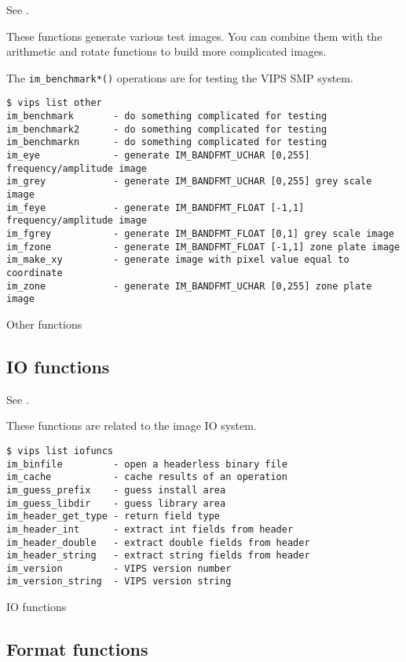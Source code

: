 See .

These functions generate various test images. You can combine them with
the arithmetic and rotate functions to build more complicated images.

The \verb+im_benchmark*()+ operations are for testing the VIPS SMP system.

\begin{fig2}
\begin{verbatim}
$ vips list other
im_benchmark       - do something complicated for testing
im_benchmark2      - do something complicated for testing
im_benchmarkn      - do something complicated for testing
im_eye             - generate IM_BANDFMT_UCHAR [0,255] frequency/amplitude image
im_grey            - generate IM_BANDFMT_UCHAR [0,255] grey scale image
im_feye            - generate IM_BANDFMT_FLOAT [-1,1] frequency/amplitude image
im_fgrey           - generate IM_BANDFMT_FLOAT [0,1] grey scale image
im_fzone           - generate IM_BANDFMT_FLOAT [-1,1] zone plate image
im_make_xy         - generate image with pixel value equal to coordinate
im_zone            - generate IM_BANDFMT_UCHAR [0,255] zone plate image
\end{verbatim}
\caption{Other functions}
\label{fg:other}
\end{fig2}

\subsection{IO functions}

See .

These functions are related to the image IO system. 

\begin{fig2}
\begin{verbatim}
$ vips list iofuncs
im_binfile         - open a headerless binary file
im_cache           - cache results of an operation
im_guess_prefix    - guess install area
im_guess_libdir    - guess library area
im_header_get_type - return field type
im_header_int      - extract int fields from header
im_header_double   - extract double fields from header
im_header_string   - extract string fields from header
im_version         - VIPS version number
im_version_string  - VIPS version string
\end{verbatim}
\caption{IO functions}
\label{fg:io}
\end{fig2}

\subsection{Format functions}

